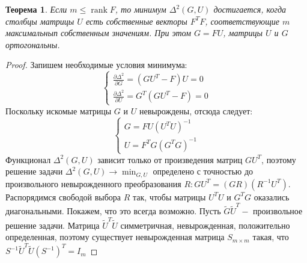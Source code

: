 {}\documentclass{article}
\newtheorem{theorem}{Теорема}
\begin{document}
\begin{theorem}
Если $m \leq \operatorname{rank} F$, то минимум $\Delta^2(G, U)$ достигается, когда столбцы матрицы $U$
есть собственные векторы $F^T F$, соответствующие $m$ максимальнып собственным значениям. При этом $G=F U$,
матрицы $U$ и $G$ ортогональны.
\end{theorem}

\begin{proof}
Запишем необходимые условия минимума:
\[
\left\{\begin{array}{l}
\frac{\partial \Delta^2}{\partial G}=\left(G U^T-F\right) U=0 \\
\frac{\partial \Delta^2}{\partial U}=G^T\left(G U^T-F\right)=0
\end{array}\right.
\]
Поскольку искомые матрицы $G$ и $U$ невырождены, отсюда следует:
\[
\left\{\begin{array}{l}
G=F U\left(U^T U\right)^{-1} \\
U=F^T G\left(G^T G\right)^{-1}
\end{array}\right.
\]
Функционал $\Delta^2(G, U)$ зависит только от произведения матриц $G U^T$, поэтому решение задачи $\Delta^2(G, U)
\rightarrow \min _{G, U}$ определено с точностью до произвольного невырожденного преобразования
$R: G U^T=(G R)\left(R^{-1} U^T\right)$. Распорядимся свободой выбора $R$ так, чтобы матрицы $U^T U$ и $G^T G$ оказались
диагональными.
Покажем, что это всегда возможно.
Пусть $\tilde{G} \tilde{U}^T-$ произвольное решение задачи.
Матрица $\tilde{U}^T \tilde{U}$ симметричная, невырожденная, положительно определенная, поэтому существует невырожденная
матрица $S_{m \times m}$ такая, что $S^{-1} \tilde{U}^T \tilde{U}\left(S^{-1}\right)^T=I_m$


\end{proof}
\end{document}
